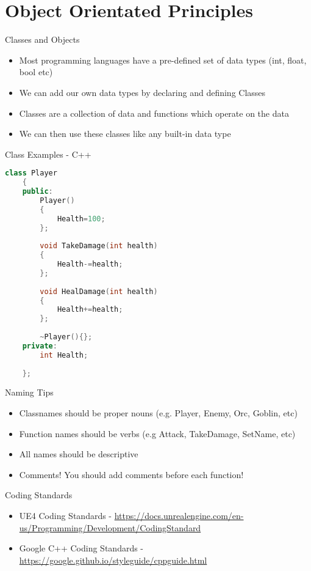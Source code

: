 \part{Object Orientated Principles}
\frame{\partpage}

\begin{frame}{Classes and Objects}
	\begin{itemize}
		\pause \item Most programming languages have a pre-defined set of data types (int, float, bool etc)
		\pause \item We can add our own data types by declaring and defining Classes
		\pause \item Classes are a collection of data and functions which operate on the data
		\pause \item We can then use these classes like any built-in data type
	\end{itemize}
\end{frame}

\begin{frame}[fragile]{Class Examples - C++}
	\begin{lstlisting}[language=C++]
	class Player
	{
	public:
		Player()
		{
			Health=100;
		};
		
		void TakeDamage(int health)
		{
			Health-=health;
		};
		
		void HealDamage(int health)
		{
			Health+=health;
		};
		
		~Player(){};
	private:
		int Health;
		
	};
	\end{lstlisting}
\end{frame}

\begin{frame}{Naming Tips}
	\begin{itemize}
		\pause \item Classnames should be proper nouns (e.g. Player, Enemy, Orc, Goblin, etc)
		\pause \item Function names should be verbs (e.g Attack, TakeDamage, SetName, etc)
		\pause \item All names should be descriptive
		\pause \item Comments! You should add comments before each function!
	\end{itemize}
\end{frame}

\begin{frame}{Coding Standards}
	\begin{itemize}
		\pause \item UE4 Coding Standards - \url{https://docs.unrealengine.com/en-us/Programming/Development/CodingStandard}
		\pause \item Google C++ Coding Standards - \url{https://google.github.io/styleguide/cppguide.html} 
	\end{itemize}
\end{frame}
